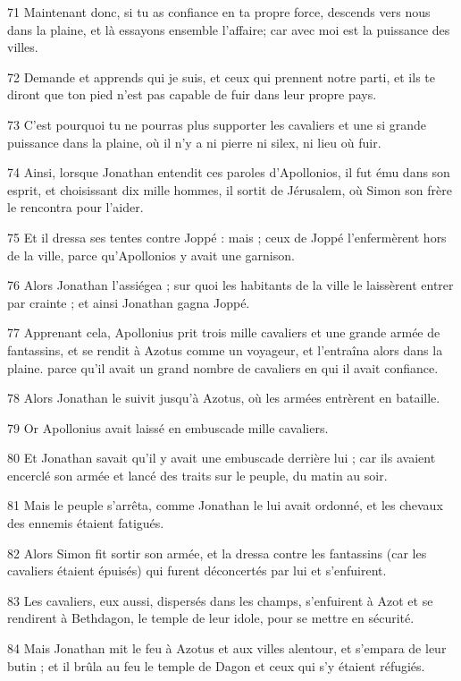 \par 71 Maintenant donc, si tu as confiance en ta propre force, descends vers nous dans la plaine, et là essayons ensemble l'affaire; car avec moi est la puissance des villes.
\par 72 Demande et apprends qui je suis, et ceux qui prennent notre parti, et ils te diront que ton pied n'est pas capable de fuir dans leur propre pays.
\par 73 C'est pourquoi tu ne pourras plus supporter les cavaliers et une si grande puissance dans la plaine, où il n'y a ni pierre ni silex, ni lieu où fuir.
\par 74 Ainsi, lorsque Jonathan entendit ces paroles d'Apollonios, il fut ému dans son esprit, et choisissant dix mille hommes, il sortit de Jérusalem, où Simon son frère le rencontra pour l'aider.
\par 75 Et il dressa ses tentes contre Joppé : mais ; ceux de Joppé l'enfermèrent hors de la ville, parce qu'Apollonios y avait une garnison.
\par 76 Alors Jonathan l'assiégea ; sur quoi les habitants de la ville le laissèrent entrer par crainte ; et ainsi Jonathan gagna Joppé.
\par 77 Apprenant cela, Apollonius prit trois mille cavaliers et une grande armée de fantassins, et se rendit à Azotus comme un voyageur, et l'entraîna alors dans la plaine. parce qu'il avait un grand nombre de cavaliers en qui il avait confiance.
\par 78 Alors Jonathan le suivit jusqu'à Azotus, où les armées entrèrent en bataille.
\par 79 Or Apollonius avait laissé en embuscade mille cavaliers.
\par 80 Et Jonathan savait qu'il y avait une embuscade derrière lui ; car ils avaient encerclé son armée et lancé des traits sur le peuple, du matin au soir.
\par 81 Mais le peuple s'arrêta, comme Jonathan le lui avait ordonné, et les chevaux des ennemis étaient fatigués.
\par 82 Alors Simon fit sortir son armée, et la dressa contre les fantassins (car les cavaliers étaient épuisés) qui furent déconcertés par lui et s'enfuirent.
\par 83 Les cavaliers, eux aussi, dispersés dans les champs, s'enfuirent à Azot et se rendirent à Bethdagon, le temple de leur idole, pour se mettre en sécurité.
\par 84 Mais Jonathan mit le feu à Azotus et aux villes alentour, et s'empara de leur butin ; et il brûla au feu le temple de Dagon et ceux qui s'y étaient réfugiés.
